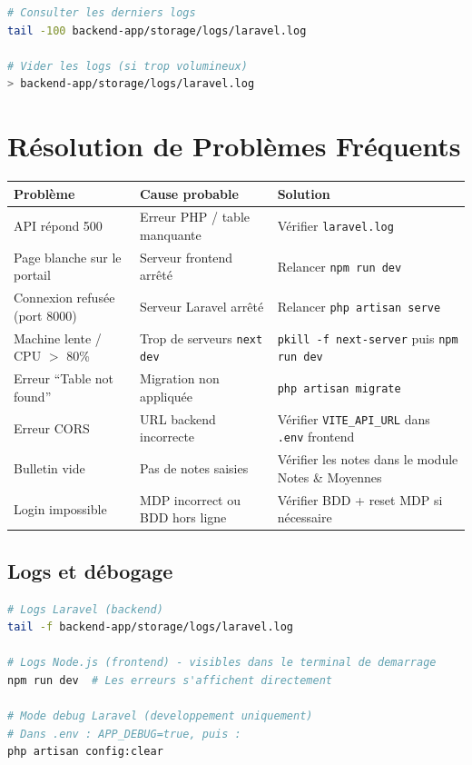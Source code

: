 \documentclass[12pt,a4paper]{report}
\begin{document}
\begin{lstlisting}[language=bash]
# Consulter les derniers logs
tail -100 backend-app/storage/logs/laravel.log

# Vider les logs (si trop volumineux)
> backend-app/storage/logs/laravel.log
\end{lstlisting}

\chapter{Résolution de Problèmes Fréquents}

\begin{tabularx}{\textwidth}{lXl}\toprule
\textbf{Problème} & \textbf{Cause probable} & \textbf{Solution} \\\midrule
API répond 500 & Erreur PHP / table manquante & Vérifier \texttt{laravel.log} \\
\addlinespace
Page blanche sur le portail & Serveur frontend arrêté & Relancer \texttt{npm run dev} \\
\addlinespace
Connexion refusée (port 8000) & Serveur Laravel arrêté & Relancer \texttt{php artisan serve} \\
\addlinespace
Machine lente / CPU $>$ 80\% & Trop de serveurs \texttt{next dev} & \texttt{pkill -f next-server} puis \texttt{npm run dev} \\
\addlinespace
Erreur ``Table not found'' & Migration non appliquée & \texttt{php artisan migrate} \\
\addlinespace
Erreur CORS & URL backend incorrecte & Vérifier \texttt{VITE\_API\_URL} dans \texttt{.env} frontend \\
\addlinespace
Bulletin vide & Pas de notes saisies & Vérifier les notes dans le module Notes \& Moyennes \\
\addlinespace
Login impossible & MDP incorrect ou BDD hors ligne & Vérifier BDD + reset MDP si nécessaire \\
\bottomrule\end{tabularx}

\section{Logs et débogage}

\begin{lstlisting}[language=bash]
# Logs Laravel (backend)
tail -f backend-app/storage/logs/laravel.log

# Logs Node.js (frontend) - visibles dans le terminal de demarrage
npm run dev  # Les erreurs s'affichent directement

# Mode debug Laravel (developpement uniquement)
# Dans .env : APP_DEBUG=true, puis :
php artisan config:clear
\end{lstlisting}
\end{document}
